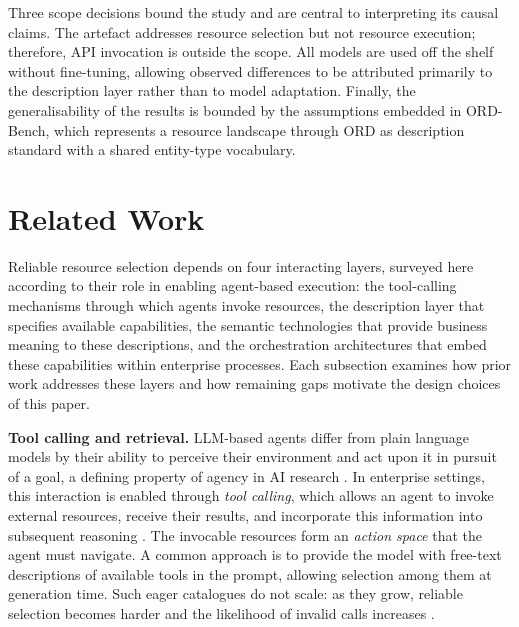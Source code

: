 \documentclass[10pt,twocolumn]{article}
\begin{document}
Three scope decisions bound the study and are central to interpreting its causal claims. The artefact addresses resource selection but not resource execution; therefore, API invocation is outside the scope. All models are used off the shelf without fine-tuning, allowing observed differences to be attributed primarily to the description layer rather than to model adaptation. Finally, the generalisability of the results is bounded by the assumptions embedded in ORD-Bench, which represents a resource landscape through ORD as description standard with a shared entity-type vocabulary.

\section{Related Work}
\label{sec:rel-c}

Reliable resource selection depends on four interacting layers, surveyed here according to their role in enabling agent-based execution: the tool-calling mechanisms through which agents invoke resources, the description layer that specifies available capabilities, the semantic technologies that provide business meaning to these descriptions, and the orchestration architectures that embed these capabilities within enterprise processes. Each subsection examines how prior work addresses these layers and how remaining gaps motivate the design choices of this paper.

\textbf{Tool calling and retrieval.} LLM-based agents differ from plain language models by their ability to perceive their environment and act upon it in pursuit of a goal, a defining property of agency in AI research \citep{russell_artificial_2022,franklin_is_1997}. In enterprise settings, this interaction is enabled through \emph{tool calling}, which allows an agent to invoke external resources, receive their results, and incorporate this information into subsequent reasoning \citep{schick_toolformer_2023,openai_function_calling_2023}. The invocable resources form an \emph{action space} that the agent must navigate. A common approach is to provide the model with free-text descriptions of available tools in the prompt, allowing selection among them at generation time. Such eager catalogues do not scale: as they grow, reliable selection becomes harder and the likelihood of invalid calls increases \citep{gonzalez_gorilla_2024}.
\end{document}
